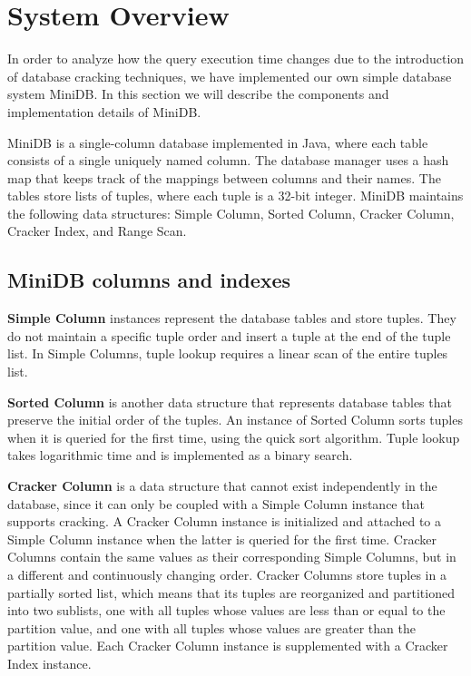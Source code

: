 \section{System Overview}
In order to analyze how the query execution time changes due to the introduction of database cracking techniques, we have implemented our own simple database system MiniDB. In this section we will describe the components and implementation details of MiniDB.

MiniDB is a single-column database implemented in Java, where each table consists of a single uniquely named column. The database manager uses a hash map that keeps track of the mappings between columns and their names.  The tables store lists of tuples, where each tuple is a 32-bit integer. MiniDB maintains the following data structures: Simple Column, Sorted Column, Cracker Column, Cracker Index, and Range Scan. 
\label{sec:system}

\subsection{MiniDB columns and indexes}
\textbf{Simple Column} instances represent the database tables and store tuples. They do not maintain a specific tuple order and insert a tuple at the end of the tuple list. In Simple Columns, tuple lookup requires a linear scan of the entire tuples list. 

\textbf{Sorted Column} is another data structure that represents database tables that preserve the initial order of the tuples. An instance of Sorted Column sorts tuples when it is queried for the first time, using the quick sort algorithm. Tuple lookup takes logarithmic time and is implemented as a binary search. 

\textbf{Cracker Column} is a data structure that cannot exist independently in the database, since it can only be coupled with a Simple Column instance that supports cracking. A Cracker Column instance is initialized and attached to a Simple Column instance when the latter is queried for the first time. Cracker Columns contain the same values as their corresponding Simple Columns, but in a different and continuously changing order. Cracker Columns store tuples in a partially sorted list, which means that its tuples are reorganized and partitioned into two sublists, one with all tuples whose values are less than or equal to the partition value, and one with all tuples whose values are greater than the partition value. Each Cracker Column instance is supplemented with a  Cracker Index instance. 

